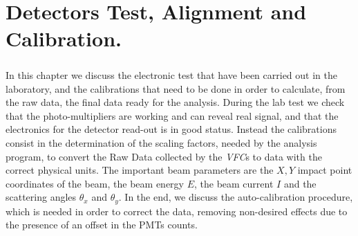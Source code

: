 \chapter{Detectors Test, Alignment and Calibration.} \label{analysis}

\paragraph{}
In this chapter we discuss the electronic test that have been carried out in the laboratory, and the calibrations that need to be done
in order to calculate, from the raw data, the final data ready for the analysis.
During the lab test we check that the photo-multipliers are working and can reveal real signal, and that the electronics for the detector read-out is in good status.
Instead the calibrations consist in the determination of the scaling factors, needed by the analysis program, to convert the Raw Data collected by the \textit{VFC}s to data with the correct physical units. The important beam parameters are the $X,Y$ impact point coordinates of the beam, the beam energy $E$, the beam current $I$ and the scattering angles $\theta_{x}$ and $\theta_{y}$. In the end, we discuss the auto-calibration procedure, which is needed in order to correct the data, removing non-desired effects due to the presence of an offset in the PMTs counts.



